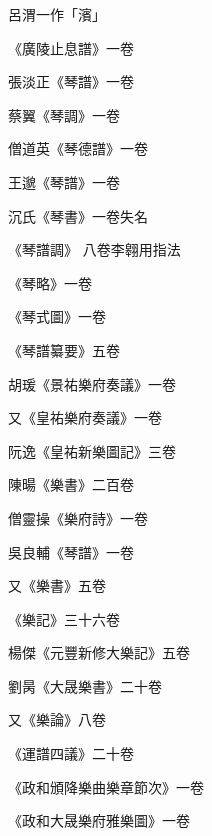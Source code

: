 \begin{pinyinscope}
 呂渭一作「濱」



 《廣陵止息譜》一卷



 張淡正《琴譜》一卷



 蔡翼《琴調》一卷



 僧道英《琴德譜》一卷



 王邈《琴譜》一卷



 沉氏《琴書》一卷失名



 《琴譜調》
 八卷李翱用指法



 《琴略》一卷



 《琴式圖》一卷



 《琴譜纂要》五卷



 胡瑗《景祐樂府奏議》一卷



 又《皇祐樂府奏議》一卷



 阮逸《皇祐新樂圖記》三卷



 陳暘《樂書》二百卷



 僧靈操《樂府詩》一卷



 吳良輔《琴譜》一卷



 又《樂書》五卷



 《樂記》三十六卷



 楊傑《元豐新修大樂記》五卷



 劉昺《大晟樂書》二十卷



 又《樂論》八卷



 《運譜四議》二十卷



 《政和頒降樂曲樂章節次》一卷



 《政和大晟樂府雅樂圖》一卷




\end{pinyinscope}
